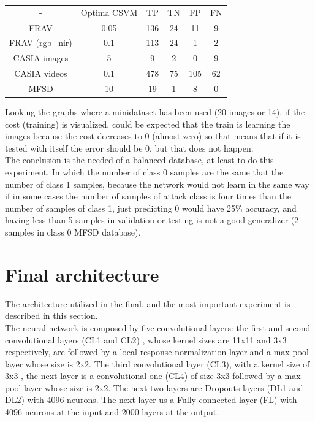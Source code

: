 \begin{table}[htb]
\centering
\label{table-ej1}
\begin{tabular}{cccccc}
-              &Optima CSVM& TP & TN & FP & FN \\
FRAV           &    0.05   & 136& 24 &  11 & 9 \\
FRAV (rgb+nir) &    0.1    & 113& 24 &  1  & 2 \\
CASIA images   &    5      & 9  & 2  &  0  & 9 \\
CASIA videos   &    0.1    & 478& 75 &  105& 62 \\
MFSD           &    10     & 19 &  1 &   8 & 0 \\
\end{tabular}
\end{table}

Looking the graphs where a minidataset has been used (20 images or 14), if the cost (training) is visualized, could be expected that the train is learning the images because the cost decreases to 0 (almost zero) so that means that if it is tested with itself the error should be 0, but that does not happen.\\

The conclusion is the needed of a balanced database, at least to do this experiment. In which the number of class 0 samples are the same that the number of class 1 samples, because the network would not learn in the same way if in some cases the number of samples of  attack class is four times than the number of samples of class 1, just predicting 0 would have 25\% accuracy, and having less than 5 samples in validation or testing is not a good generalizer (2 samples in class 0 MFSD database).\\

\section{Final architecture}\label{Final_archi} %
The architecture utilized in the final, and the most important experiment is described in this section.\\

The neural network is composed by five convolutional layers: the first and second convolutional layers (CL1 and CL2) , whose kernel sizes are 11x11 and 3x3 respectively, are followed by a local response normalization layer and a max pool layer whose size is 2x2. The third convolutional layer (CL3), with a kernel size of 3x3 , the next layer is a convolutional one (CL4) of size 3x3 followed by a max-pool layer whose size is 2x2. The next two layers are Dropouts layers (DL1 and DL2) with 4096 neurons. The next layer us a Fully-connected layer (FL) with 4096 neurons at the input and 2000 layers at the output.\\

